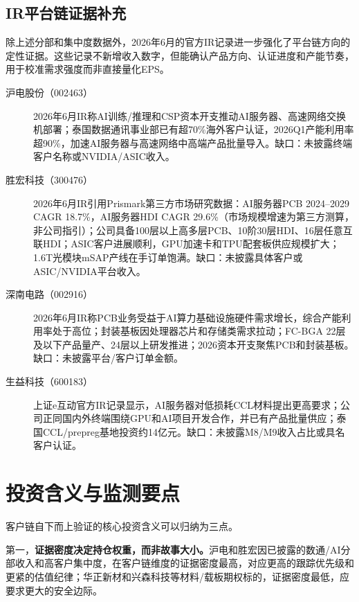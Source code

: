 \subsection{IR平台链证据补充}

除上述分部和集中度数据外，2026年6月的官方IR记录进一步强化了平台链方向的定性证据。这些记录不新增收入数字，但能确认产品方向、认证进度和产能节奏，用于校准需求强度而非直接量化EPS。

\begin{exhibitbox}[图表5-17：IR记录强化平台链证据]
\footnotesize
\begin{description}
  \item[沪电股份（002463）] 2026年6月IR称AI训练/推理和CSP资本开支推动AI服务器、高速网络交换机部署；泰国数据通讯事业部已有超70\%海外客户认证，2026Q1产能利用率超90\%，加速AI服务器与高速网络中高端产品批量导入。缺口：未披露终端客户名称或NVIDIA/ASIC收入。
  \item[胜宏科技（300476）] 2026年6月IR引用Prismark第三方市场研究数据：AI服务器PCB 2024--2029 CAGR 18.7\%，AI服务器HDI CAGR 29.6\%（市场规模增速为第三方测算，非公司指引）；公司具备100层以上高多层PCB、10阶30层HDI、16层任意互联HDI；ASIC客户进展顺利，GPU加速卡和TPU配套板供应规模扩大；1.6T光模块mSAP产线在手订单饱满。缺口：未披露具体客户或ASIC/NVIDIA平台收入。
  \item[深南电路（002916）] 2026年6月IR称PCB业务受益于AI算力基础设施硬件需求增长，综合产能利用率处于高位；封装基板因处理器芯片和存储类需求拉动；FC-BGA 22层及以下产品量产、24层以上研发推进；2026资本开支聚焦PCB和封装基板。缺口：未披露平台/客户订单金额。
  \item[生益科技（600183）] 上证e互动官方IR记录显示，AI服务器对低损耗CCL材料提出更高要求；公司正同国内外终端围绕GPU和AI项目开发合作，并已有产品批量供应；泰国CCL/prepreg基地投资约14亿元。缺口：未披露M8/M9收入占比或具名客户认证。
\end{description}
\end{exhibitbox}

\section{投资含义与监测要点}

客户链自下而上验证的核心投资含义可以归纳为三点。

第一，\textbf{证据密度决定持仓权重，而非故事大小。}沪电和胜宏因已披露的数通/AI分部收入和高客户集中度，在客户链维度的证据密度最高，对应更高的跟踪优先级和更紧的估值纪律；华正新材和兴森科技等材料/载板期权标的，证据密度最低，应要求更大的安全边际。

